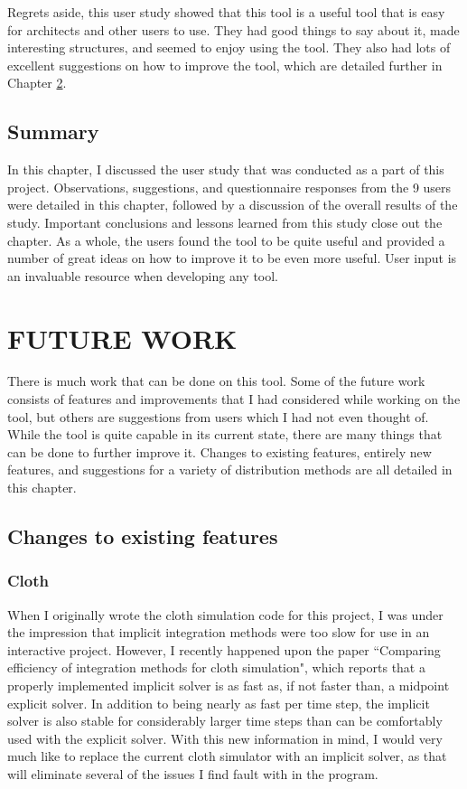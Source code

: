 \documentclass{thesis}
\begin{document}
Regrets aside, this user study showed that this tool is a useful tool that is easy for architects and other users to use.  They
had good things to say about it, made interesting structures, and seemed to enjoy using the tool.  They also had lots of excellent
suggestions on how to improve the tool, which are detailed further in Chapter \ref{chp:future}.

\section{Summary}
In this chapter, I discussed the user study that was conducted as a part of this project.  Observations, suggestions, and
questionnaire responses from the 9 users were detailed in this chapter, followed by a discussion of the overall results of the study.
Important conclusions and lessons learned from this study close out the chapter.
As a whole, the users found the tool to be quite useful and provided a number of great ideas on how to improve it to be even more
useful.  User input is an invaluable resource when developing any tool.


\chapter{FUTURE WORK}
\label{chp:future}
There is much work that can be done on this tool.  Some of the future work consists of features and improvements that I had considered
while working on the tool, but others are suggestions from users which I had not even thought of.  While the tool is quite capable in
its current state, there are many things that can be done to further improve it.  Changes to existing features, entirely new features,
and suggestions for a variety of distribution methods are all detailed in this chapter.

\section{Changes to existing features}

\subsection{Cloth}
\label{subsec:changecloth}
When I originally wrote the cloth simulation code for this project, I was under the impression that implicit integration methods were
too slow for use in an interactive project.  However, I recently happened upon the paper ``Comparing efficiency of integration methods
for cloth simulation"\cite{volino01comparingefficiency}\nocite{volino00fastcloth}, which reports that a properly implemented implicit
solver is as fast as, if not faster than, a midpoint explicit solver.  In addition to being nearly as fast per time step, the implicit
solver is also stable for considerably larger time steps than can be comfortably used with the explicit solver.  With this new
information in mind, I would very much like to replace the current cloth simulator with an implicit solver, as that will eliminate
several of the issues I find fault with in the program.
\end{document}

